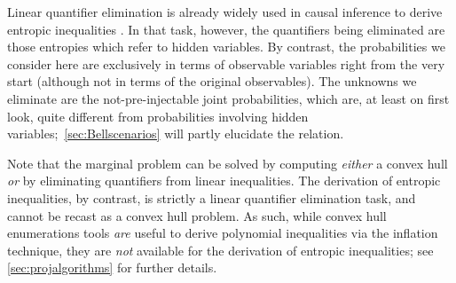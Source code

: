 Linear quantifier elimination is already widely used in causal inference to derive entropic inequalities \cite{fritz2013marginal,chaves2014novel,chaves2014informationinference}. In that task, however, the quantifiers being eliminated are those entropies which refer to hidden variables. By contrast, the probabilities we consider here are exclusively in terms of observable variables right from the very start (although not in terms of the original observables). The unknowns we eliminate are the not-pre-injectable joint probabilities, which are, at least on first look, quite different from probabilities involving hidden variables;~\cref{sec:Bellscenarios} will partly elucidate the relation.

Note that the marginal problem can be solved by computing \emph{either} a convex hull \emph{or} by eliminating quantifiers from linear inequalities. The derivation of entropic inequalities, by contrast, is strictly a linear quantifier elimination task, and cannot be recast as a convex hull problem. As such, while convex hull enumerations tools \emph{are} useful to derive polynomial inequalities via the inflation technique, they are \emph{not} available for the derivation of entropic inequalities; see \cref{sec:projalgorithms} for further details.




